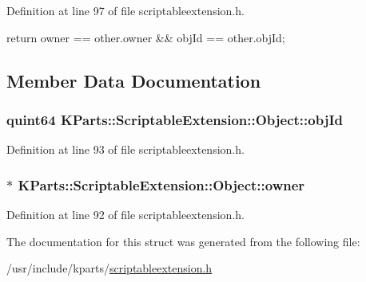 \-Definition at line 97 of file scriptableextension.\-h.


\begin{DoxyCode}
{ return owner == other.owner && objId == other.objId; }
\end{DoxyCode}


\subsection{\-Member \-Data \-Documentation}
\hypertarget{structKParts_1_1ScriptableExtension_1_1Object_a884270fd3423ea40ec2920cb15c9bd15}{
\subsubsection[{obj\-Id}]{\setlength{\rightskip}{0pt plus 5cm}quint64 {\bf \-K\-Parts\-::\-Scriptable\-Extension\-::\-Object\-::obj\-Id}}}\label{structKParts_1_1ScriptableExtension_1_1Object_a884270fd3423ea40ec2920cb15c9bd15}


\-Definition at line 93 of file scriptableextension.\-h.

\hypertarget{structKParts_1_1ScriptableExtension_1_1Object_a2e2ad2aca3cec31e49e8393658a6997c}{
\subsubsection[{owner}]{$\ast$ {\bf \-K\-Parts\-::\-Scriptable\-Extension\-::\-Object\-::owner}}}\label{structKParts_1_1ScriptableExtension_1_1Object_a2e2ad2aca3cec31e49e8393658a6997c}


\-Definition at line 92 of file scriptableextension.\-h.



\-The documentation for this struct was generated from the following file\-:\begin{DoxyCompactItemize}
\item 
/usr/include/kparts/\hyperlink{scriptableextension_8h}{scriptableextension.\-h}\end{DoxyCompactItemize}
